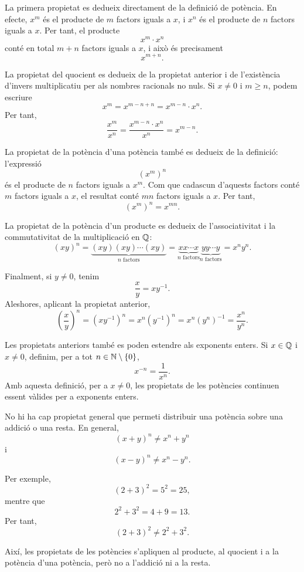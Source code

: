 \begin{prova}
La primera propietat es dedueix directament de la definició de potència. En efecte, \(x^m\) és el producte de \(m\) factors iguals a \(x\), i \(x^n\) és el producte de \(n\) factors iguals a \(x\). Per tant, el producte
\[
	x^m\cdot x^n
\]
conté en total \(m+n\) factors iguals a \(x\), i això és precisament
\[
	x^{m+n}.
\]

La propietat del quocient es dedueix de la propietat anterior i de l'existència d'invers multiplicatiu per als nombres racionals no nuls. Si \(x\neq0\) i \(m\geq n\), podem escriure
\[
	x^m=x^{m-n+n}=x^{m-n}\cdot x^n.
\]
Per tant,
\[
	\frac{x^m}{x^n}
	=
	\frac{x^{m-n}\cdot x^n}{x^n}
	=
	x^{m-n}.
\]

La propietat de la potència d'una potència també es dedueix de la definició: l'expressió
\[
	\left(x^m\right)^n
\]
és el producte de \(n\) factors iguals a \(x^m\). Com que cadascun d'aquests factors conté \(m\) factors iguals a \(x\), el resultat conté \(mn\) factors iguals a \(x\). Per tant,
\[
	\left(x^m\right)^n=x^{mn}.
\]

La propietat de la potència d'un producte es dedueix de l'associativitat i la commutativitat de la multiplicació en \(\mathbb{Q}\):
\[
	(xy)^n
	=
	\underbrace{(xy)(xy)\cdots(xy)}_{n\text{ factors}}
	=
	\underbrace{x x\cdots x}_{n\text{ factors}}
	\underbrace{y y\cdots y}_{n\text{ factors}}
	=
	x^n y^n.
\]

Finalment, si \(y\neq0\), tenim
\[
	\frac{x}{y}=xy^{-1}.
\]
Aleshores, aplicant la propietat anterior,
\[
	\left(\frac{x}{y}\right)^n
	=
	(xy^{-1})^n
	=
	x^n(y^{-1})^n
	=
	x^n(y^n)^{-1}
	=
	\frac{x^n}{y^n}.
\]
\end{prova}

\begin{observacio}
Les propietats anteriors també es poden estendre als exponents enters. Si \(x\in\mathbb{Q}\) i \(x\neq0\), definim, per a tot \(n\in\mathbb{N}\setminus\{0\}\),
\[
	x^{-n}=\frac{1}{x^n}.
\]
Amb aquesta definició, per a \(x\neq0\), les propietats de les potències continuen essent vàlides per a exponents enters.
\end{observacio}

\begin{observacio}
No hi ha cap propietat general que permeti distribuir una potència sobre una addició o una resta. En general,
\[
	(x+y)^n\neq x^n+y^n
\]
i
\[
	(x-y)^n\neq x^n-y^n.
\]

Per exemple,
\[
	(2+3)^2=5^2=25,
\]
mentre que
\[
	2^2+3^2=4+9=13.
\]
Per tant,
\[
	(2+3)^2\neq 2^2+3^2.
\]

Així, les propietats de les potències s'apliquen al producte, al quocient i a la potència d'una potència, però no a l'addició ni a la resta.
\end{observacio}


